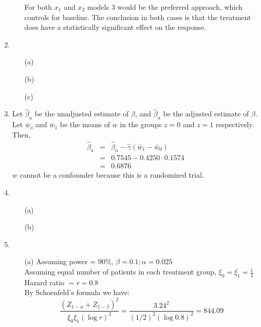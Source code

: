 \documentclass[11pt,a4paper]{article}
\begin{document}
\begin{enumerate}
\begin{enumerate}
For both $x_1$ and $x_2$ models 3 would be the preferred approach, which controls for baseline. The conclusion in both cases is that the treatment does have a statistically significant effect on the response. 
\end{enumerate}

\newpage
\item
\begin{enumerate}
\item[(a)] 
\item[(b)] 
\item[(c)] 
\end{enumerate}

\newpage
\item
Let $\hat{\beta}_u$ be the unadjusted estimate of $\beta$, and $\hat{\beta}_a$ be the adjusted estimate of $\beta$. Let $\bar{w}_o$ and $\bar{w}_1$ be the means of $w$ in the groups $z = 0$ and $z = 1$ respectively. Then,
\begin{eqnarray*}
\hat{\beta}_a & = & \hat{\beta}_u - \hat{\gamma}(\bar{w}_1 - \bar{w}_0) \\
              & = & 0.7545 - 0.4250 \cdot 0.1574 \\
              & = & 0.6876
\end{eqnarray*}
$w$ cannot be a confounder because this is a randomized trial.

\newpage
\item
\begin{enumerate}
\item[(a)] 
\item[(b)] 
\end{enumerate}

\newpage
\item
\begin{enumerate}
\item[(a)] 
Assuming power = 90\%, $\beta = 0.1; \alpha = 0.025$ \\
Assuming equal number of patients in each treatment group, $\xi_0=\xi_1=\frac{1}{2}$ \\
Hazard ratio $= r = 0.8$ \\
By Schoenfeld’s formula we have:
\[ \dfrac{(Z_{1-\alpha}+Z_{1-\beta})^ 2}{\xi_0\xi_1(\log r)^2} = \dfrac{3.24^ 2}{(1/2)^2(\log 0.8)^2} = 844.09 \]


\end{enumerate}
\end{enumerate}
\end{document}
